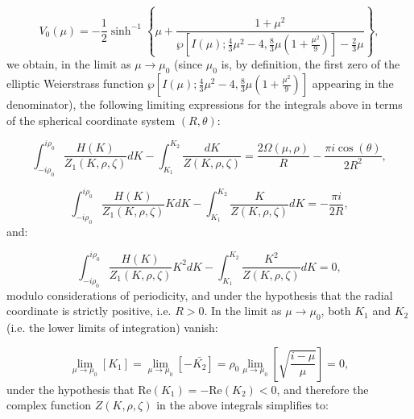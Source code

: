 \documentclass{article}
\begin{document}
\begin{equation}
V_0 \left( \mu \right) = - \frac{1}{2} \sinh^{-1} \left\lbrace \mu + \frac{1 + \mu^2}{\wp \left[ I \left( \mu \right) ; \frac{4}{3} \mu^2 - 4, \frac{8}{3} \mu \left( 1 + \frac{\mu^2}{9} \right) \right] - \frac{2}{3} \mu} \right\rbrace,
\end{equation}
we obtain, in the limit as ${\mu \to \mu_0}$ (since ${\mu_0}$ is, by definition, the first zero of the elliptic Weierstrass function ${\wp \left[ I \left( \mu \right) ; \frac{4}{3} \mu^2 - 4, \frac{8}{3} \mu \left( 1 + \frac{\mu^2}{9} \right) \right]}$ appearing in the denominator), the following limiting expressions for the integrals above in terms of the spherical coordinate system ${\left( R, \theta \right)}$:

\begin{equation}
\int_{- i \rho_0}^{i \rho_0} \frac{H \left( K \right)}{Z_1 \left( K, \rho, \zeta \right)} d K - \int_{K_1}^{K_2} \frac{d K}{Z \left( K, \rho, \zeta \right)} = \frac{2 \Omega \left( \mu, \rho \right)}{R} - \frac{\pi i \cos \left( \theta \right)}{2 R^2},
\end{equation}

\begin{equation}
\int_{- i \rho_0}^{i \rho_0} \frac{H \left( K \right)}{Z_1 \left( K, \rho, \zeta \right)} K d K - \int_{K_1}^{K_2} \frac{K}{Z \left( K, \rho, \zeta \right)} d K = - \frac{\pi i}{2 R},
\end{equation}
and:

\begin{equation}
\int_{- i \rho_0}^{i \rho_0} \frac{H \left( K \right)}{Z_1 \left( K, \rho, \zeta \right)} K^2 d K - \int_{K_1}^{K_2} \frac{K^2}{Z \left( K, \rho, \zeta \right)} d K = 0,
\end{equation}
modulo considerations of periodicity, and under the hypothesis that the radial coordinate is strictly positive, i.e. ${R > 0}$. In the limit as ${\mu \to \mu_0}$, both ${K_1}$ and ${K_2}$ (i.e. the lower limits of integration) vanish:

\begin{equation}
\lim_{\mu \to \mu_0} \left[ K_1 \right] = \lim_{\mu \to \mu_0} \left[ - \bar{K_2} \right] = \rho_0 \lim_{\mu \to \mu_0} \left[ \sqrt{\frac{i - \mu}{\mu}} \right] = 0,
\end{equation}
under the hypothesis that ${\mathrm{Re} \left( K_1 \right) = - \mathrm{Re} \left( K_2 \right) < 0}$, and therefore the complex function ${Z \left( K, \rho, \zeta \right)}$ in the above integrals simplifies to:
\end{document}
